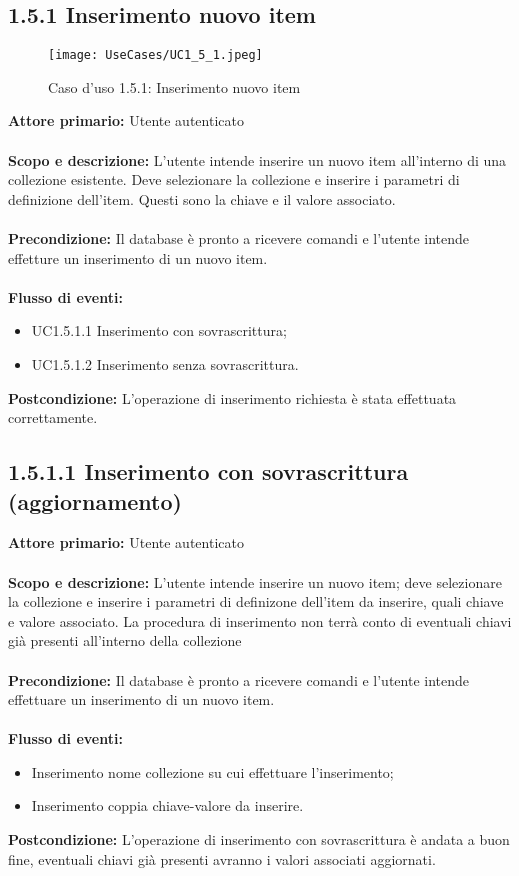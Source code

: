 \documentclass{scalatekids-article}
\begin{document}
\subsection{1.5.1 Inserimento nuovo item}
\begin{figure}[H]
  \begin{center}
    \texttt{[image: UseCases/UC1\_5\_1.jpeg]}
    \caption{Caso d'uso 1.5.1: Inserimento nuovo item}
  \end{center}
\end{figure}
\textbf{Attore primario:} Utente autenticato\\ \\
\textbf{Scopo e descrizione:} L'utente intende inserire un nuovo item all'interno di una collezione esistente. Deve selezionare la collezione e inserire i parametri di definizione dell'item. Questi sono la chiave e il valore associato.\\ \\
\textbf{Precondizione:} Il database è pronto a ricevere comandi e l'utente intende effetture un inserimento di un nuovo item.\\ \\
\textbf{Flusso di eventi:}
\begin{itemize}
\item UC1.5.1.1 Inserimento con sovrascrittura;
\item UC1.5.1.2 Inserimento senza sovrascrittura.
\end{itemize}
\textbf{Postcondizione:} L'operazione di inserimento richiesta è stata effettuata correttamente.
\subsection{1.5.1.1 Inserimento con sovrascrittura (aggiornamento)}
\textbf{Attore primario:} Utente autenticato\\ \\
\textbf{Scopo e descrizione:} L'utente intende inserire un nuovo item; deve selezionare la collezione e inserire i parametri di definizone dell'item da inserire, quali chiave e valore associato. La procedura di inserimento non terrà conto di
eventuali chiavi già presenti all'interno della collezione\\ \\
\textbf{Precondizione:} Il database è pronto a ricevere comandi e l'utente intende effettuare un inserimento di un nuovo item.\\ \\
\textbf{Flusso di eventi:}
\begin{itemize}
\item Inserimento nome collezione su cui effettuare l'inserimento;
\item Inserimento coppia chiave-valore da inserire.
\end{itemize}
\textbf{Postcondizione:} L'operazione di inserimento con sovrascrittura è andata a buon fine, eventuali chiavi già presenti avranno i valori associati aggiornati.
\end{document}
